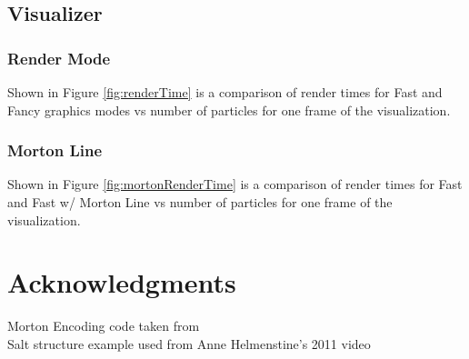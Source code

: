 \documentclass[fleqn,10pt]{UserGuideArx} %
\begin{document}
\subsection{Visualizer}
\subsubsection{Render Mode}
Shown in Figure \ref{fig:renderTime} is a comparison of render times for Fast and Fancy graphics modes vs number of particles for one frame of the visualization. 
\subsubsection{Morton Line}
Shown in Figure \ref{fig:mortonRenderTime} is a comparison of render times for Fast and Fast w/ Morton Line vs number of particles for one frame of the visualization.


\section*{Acknowledgments} %
Morton Encoding code taken from \cite{Karras:2012}\\
Salt structure example used from Anne Helmenstine's 2011 video \cite{Helmenstine:2011}



\end{document}
